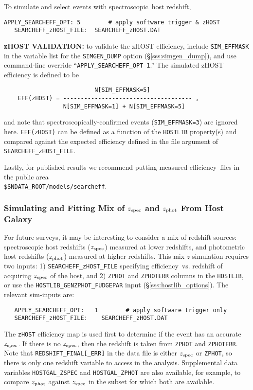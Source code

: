 \documentclass[12pt]{article}
\newcommand{\Zphot}{z_{\rm phot}}
\newcommand{\Zspec}{z_{\rm spec}}
\newcommand{\eff}{efficiency}
\newcommand{\spec}{spectroscopic}
\begin{document}
{\bigskip\noindent
To simulate and select events with \spec\ host redshift,
\begin{Verbatim}[frame=single]
   APPLY_SEARCHEFF_OPT: 5        # apply software trigger & zHOST
   SEARCHEFF_zHOST_FILE:  SEARCHEFF_zHOST.DAT
\end{Verbatim}

{\bf zHOST VALIDATION:}
to validate the zHOST efficiency, include {\tt SIM\_EFFMASK} in the
variable list for the {\tt SIMGEN\_DUMP} option (\S\ref{sss:simgen_dump}), 
and use command-line override  ``{\tt APPLY\_SEARCHEFF\_OPT 1}.'' 
The simulated zHOST efficiency is defined to be
\begin{verbatim}
                          N[SIM_EFFMASK=5]
    EFF(zHOST) = ------------------------------------- ,
                 N[SIM_EFFMASK=1] + N[SIM_EFFMASK=5] 
\end{verbatim}
and note that spectroscopically-confirmed events ({\tt SIM\_EFFMASK=3})
are ignored here.
{\tt EFF(zHOST)} can be defined as a function of the {\tt HOSTLIB}
property(s) and compared against the expected efficiency defined
in the file argument of {\tt SEARCHEFF\_zHOST\_FILE}.


\bigskip\noindent
Lastly, for published results we recommend putting measured \eff\ 
files in the public area \\ {\tt \$SNDATA\_ROOT/models/searcheff}.

  \clearpage
   \subsubsection{Simulating and Fitting Mix of $\Zspec$ and $\Zphot$ From Host Galaxy}
   \label{sssec:sim_zmix}

For future surveys, it may be interesting to consider a mix of redshift sources:
spectroscopic host redshifts ($\Zspec$) measured at lower redshifts, 
and photometric host redshifts ($\Zphot$) measured at higher redshifts.
This mix-$z$ simulation requires two inputs: 1) {\tt SEARCHEFF\_zHOST\_FILE} 
specifying \eff\ vs. redshift of acquiring $\Zspec$ of the host, and
2) {\tt ZPHOT} and {\tt ZPHOTERR} columns in the {\tt HOSTLIB}, or use the
{\tt HOSTLIB\_GENZPHOT\_FUDGEPAR} input (\S\ref{sss:hostlib_options}).
The relevant sim-inputs are:
%
\begin{Verbatim}
   APPLY_SEARCHEFF_OPT:   1        # apply software trigger only
   SEARCHEFF_zHOST_FILE:    SEARCHEFF_zHOST.DAT
\end{Verbatim}
%
The {\tt zHOST} efficiency map is used first to determine if the event has an accurate $\Zspec$.
If there is no $\Zspec$, then the redshift is taken from {\tt ZPHOT} and {\tt ZPHOTERR}.
Note that {\tt REDSHIFT\_FINAL[\_ERR]} in the data file is either $\Zspec$ or {\tt ZPHOT},
so there is only one redshift variable to access in the analysis. Supplemental data variables
{\tt HOSTGAL\_ZSPEC} and {\tt HOSTGAL\_ZPHOT} are also available, for example,
to compare $\Zphot$ against $\Zspec$ in the subset for which both are available.

}
\end{document}

